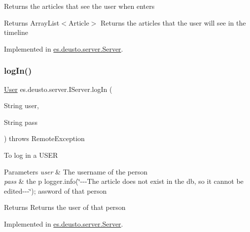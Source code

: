 Returns the articles that see the user when enters

\begin{DoxyReturn}{Returns}
Array\+List$<$\+Article$>$ Returns the articles that the user will see in the timeline 
\end{DoxyReturn}


Implemented in \hyperlink{classes_1_1deusto_1_1server_1_1_server_a64dfcee7821b0cc581367c1b21d9f97f}{es.\+deusto.\+server.\+Server}.

\mbox{\label{interfacees_1_1deusto_1_1server_1_1_i_server_ae6b27c8714c2e2eadc9a55bccb0543fc}} 
\subsubsection{\texorpdfstring{log\+In()}{logIn()}}
{\footnotesize\ttfamily \hyperlink{classes_1_1deusto_1_1server_1_1jdo_1_1_user}{User} es.\+deusto.\+server.\+I\+Server.\+log\+In (\begin{DoxyParamCaption}\item[{String}]{user,  }\item[{String}]{pass }\end{DoxyParamCaption}) throws Remote\+Exception}

To log in a U\+S\+ER


\begin{DoxyParams}{Parameters}
{\em user} & The username of the person \\
\hline
{\em pass} & the p logger.\+info(\char`\"{}-\/-\/-\/\+The article does not exist in the db, so it
            cannot be edited-\/-\/-\/\char`\"{}); assword of that person \\
\hline
\end{DoxyParams}
\begin{DoxyReturn}{Returns}
Returns the user of that person 
\end{DoxyReturn}


Implemented in \hyperlink{classes_1_1deusto_1_1server_1_1_server_a5a570da0fbfec7afdf56bd3648fc904f}{es.\+deusto.\+server.\+Server}.

\mbox{\label{interfacees_1_1deusto_1_1server_1_1_i_server_a65588c309522410e6a6d9c27d80821a7}} 
